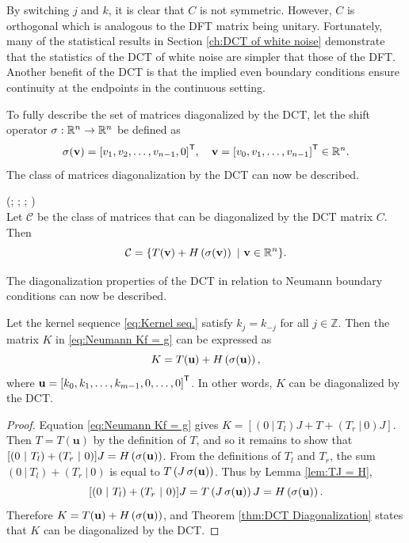 By switching $j$ and $k$, it is clear that $C$ is not symmetric. However, $C$ is orthogonal which is analogous to the DFT matrix being unitary. Fortunately, many of the statistical results in Section \ref{ch:DCT of white noise} demonstrate that the statistics of the DCT of white noise are simpler that those of the DFT. Another benefit of the DCT is that the implied even boundary conditions ensure continuity at the endpoints in the continuous setting. \par
To fully describe the set of matrices diagonalized by the DCT, let the shift operator $\operatorname{\sigma}: \mathbb{R}^n \rightarrow \mathbb{R}^n$ be defined as
\[\operatorname{\sigma}(\mathbf{v}) = {[v_1,v_2,\ldots,v_{n-1},0]}^\mathsf{T}, \quad \mathbf{v} = {[v_0,v_1,\ldots,v_{n-1}]}^\mathsf{T} \in \mathbb{R}^n.\] 
The class of matrices diagonalization by the DCT can now be described.
\begin{theorem}
\label{thm:DCT Diagonalization}
{(\cite{ChanChanWong}; \cite{KailathOlshevsky1996}; \cite{Martucci1994}; \cite{Sanchez_et_al})} \\
Let $\mathcal{C}$ be the class of matrices that can be diagonalized by the DCT matrix $C$. Then
\[\mathcal{C} = \{T(\mathbf{v}) + H\left(\operatorname{\sigma}(\mathbf{v})\right) ~|~ \mathbf{v} \in \mathbb{R}^n\}.\]
\end{theorem}
The diagonalization properties of the DCT in relation to Neumann boundary conditions can now be described.
\begin{theorem}
\label{thm:Neumann Diagonalization}
Let the kernel sequence \eqref{eq:Kernel seq.} satisfy $k_j = k_{-j}$ for all $j \in \mathbb{Z}$. Then the matrix $K$ in \eqref{eq:Neumann Kf = g} can be expressed as
\[K = T(\mathbf{u}) + H\left(\operatorname{\sigma}(\mathbf{u})\right),\]
where $\mathbf{u} = {[k_0,k_1,\ldots,k_{m-1},0,\ldots,0]}^\mathsf{T}$. In other words, $K$ can be diagonalized by the DCT.
\end{theorem}
\begin{proof}
Equation \eqref{eq:Neumann Kf = g} gives $K = [(0~|~T_{l})J + T + (T_{r}~|~0)J]$. Then $T = T(\mathbf{u})$ by the definition of $T$, and so it remains to show that $[(0~|~T_{l}) + (T_{r}~|~0)]J = H\left(\operatorname{\sigma}(\mathbf{u})\right)$. From the definitions of $T_{l}$ and $T_{r}$, the sum $(0~|~T_{l}) + (T_{r}~|~0)$ is equal to $T\left(J\operatorname{\sigma}(\mathbf{u})\right)$. Thus by Lemma \ref{lem:TJ = H},
\[[(0~|~T_{l}) + (T_{r}~|~0)]J = T\left(J\operatorname{\sigma}(\mathbf{u})\right)J = H\left(\operatorname{\sigma}(\mathbf{u})\right).\]
Therefore $K = T(\mathbf{u}) + H\left(\operatorname{\sigma}(\mathbf{u})\right)$, and Theorem \ref{thm:DCT Diagonalization} states that $K$ can be diagonalized by the DCT. 
\end{proof}


